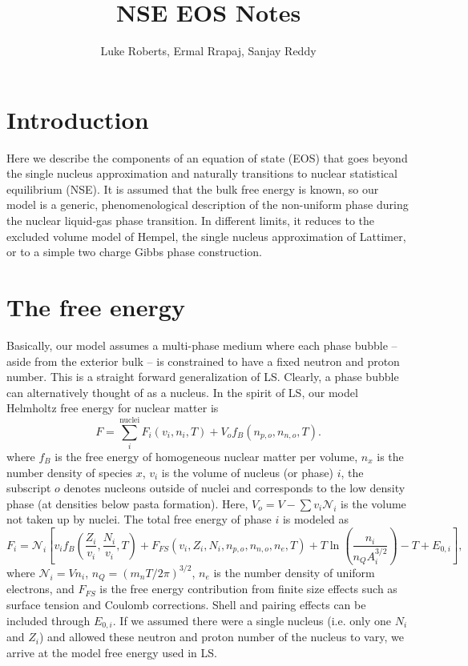 \documentclass[11pt,letter]{article}
\title{NSE EOS Notes}
\author{Luke Roberts, Ermal Rrapaj, Sanjay Reddy}
\date{} %
\begin{document}
\maketitle
\tableofcontents

\section{Introduction}
Here we describe the components of an equation of state (EOS) that goes beyond
the single nucleus approximation and naturally transitions to nuclear
statistical equilibrium (NSE).  It is assumed that the bulk free energy is
known, so our model is a generic, phenomenological description of the
non-uniform phase during the nuclear liquid-gas phase transition.  In different
limits, it reduces to the excluded volume model of Hempel, the single nucleus
approximation of Lattimer, or to a simple two charge Gibbs phase construction.  

\section{The free energy}  
Basically, our model assumes a multi-phase medium where each phase bubble --
aside from the exterior bulk -- is constrained to have a fixed neutron and
proton number.  This is a straight forward generalization of LS.  Clearly, a
phase bubble can alternatively thought of as a nucleus.  In the spirit of LS,
our model Helmholtz free energy for nuclear matter is 
\begin{equation}
F = \sum_i^{\textrm{nuclei}} F_i(v_i,n_i,T) + V_o f_{B}(n_{p,o},n_{n,o},T).
\end{equation}
where $f_B$ is the free energy of homogeneous nuclear matter per volume, $n_x$
is the number density of species $x$, $v_i$ is the volume of nucleus (or phase)
$i$, the subscript $o$ denotes nucleons outside of nuclei and corresponds to the
low density phase (at densities below pasta formation).  Here, $V_o = V - \sum v_i \mathcal{N}_i$ is the volume 
not taken up by nuclei.  The total free energy
of phase $i$ is modeled as 
\begin{equation}
F_i = \mathcal{N}_i \left[ v_i f_B(\frac{Z_i}{v_i},\frac{N_i}{v_i},T) 
+ F_{FS}(v_i,Z_i,N_i,n_{p,o},n_{n,o},n_e,T) + T \ln \left(\frac{n_i}{n_Q A_i^{3/2}}\right) 
- T + E_{0,i}\right],
\end{equation}   
where $\mathcal{N}_i = V n_i$, $n_Q = (m_n T / 2 \pi)^{3/2}$, $n_e$ is the
number density of uniform electrons, and $F_{FS}$ is the free energy
contribution from finite size effects such as surface tension and Coulomb
corrections.  Shell and pairing effects can be included through $E_{0,i}$.  If
we assumed there were a single nucleus (i.e. only one $N_i$ and $Z_i$) and
allowed these neutron and proton number of the nucleus to vary, we arrive at the
model free energy used in LS.  
\end{document}
